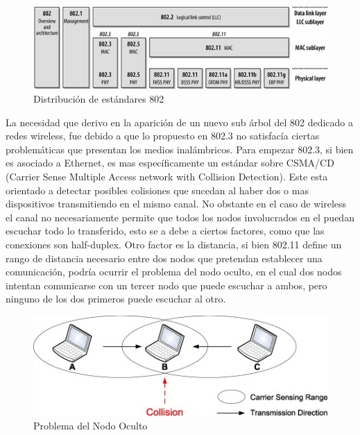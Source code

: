 \documentclass[10pt,a4paper]{article}
\begin{document}
\begin{figure}[H]
\centerline{\includegraphics[scale=0.75]{images/802_network_family.jpg}}
\caption{Distribución de estándares 802}
\end{figure}

La necesidad que derivo en la aparición de un nuevo sub árbol del 802 dedicado a redes wireless, fue debido a que lo propuesto en 802.3 no satisfacía ciertas problemáticas que presentan los medios inalámbricos. Para empezar 802.3, si bien es asociado a Ethernet, es mas específicamente un estándar sobre CSMA/CD (Carrier Sense Multiple Access network with Collision Detection). Este esta orientado a detectar posibles colisiones que sucedan al haber dos o mas dispositivos transmitiendo en el mismo canal. No obstante en el caso de wireless el canal no necesariamente permite que todos los nodos involucrados en el puedan escuchar todo lo transferido, esto se a debe a ciertos factores, como que las conexiones son half-duplex. Otro factor es la distancia, si bien 802.11 define un rango de distancia necesario entre dos nodos que pretendan establecer una comunicación, podría ocurrir el problema del nodo oculto, en el cual dos nodos intentan comunicarse con un tercer nodo que puede escuchar a ambos, pero ninguno de los dos primeros puede escuchar al otro.

\begin{figure}[H]
\centerline{\includegraphics[scale=1.2]{images/hidden_node_problem.jpg}}
\caption{Problema del Nodo Oculto}
\end{figure}
\end{document}

